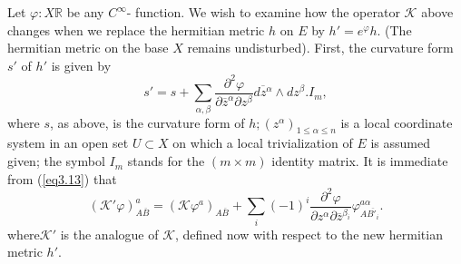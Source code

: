   Let $\varphi : X \mathbb{R}$ be any $C^{\infty}$- function. We
  wish to examine how the operator $\mathcal{K}$ above changes when we
  replace the hermitian metric $h$ on $E$ by $h'=e^\varphi h$. (The
  hermitian metric on the base $X$ remains undisturbed). First, the
  curvature form $s'$ of $h'$ is given by  
  $$
  s' = s + \sum\limits_{\alpha,\beta}\frac{\partial^2
    \varphi}{\partial \overline{z}^\alpha \partial
    z^\beta}\overline{dz^\alpha}\wedge dz^\beta. I_m , 
  $$
  where $s$, as above, is the curvature form of $h; (z^\alpha)_{1\leq
    \alpha \leq n}$ is a local coordinate system in an open set 
  $U\subset X$ on which a local trivialization of $E$ is assumed given;
  the symbol $I_m$ stands for the $(m \times m)$ identity matrix. It is
  immediate from (\ref{eq3.13}) that  
  $$
  (\mathcal{K}'\varphi)^a_{A\overline{B}}=( \mathcal{K}\varphi^a)_{A\overline{B}}+ 
  \displaystyle\sum_i(-1)^i \frac{\partial^2 \varphi}{\partial z^\alpha
    \partial \overline{z}^{\beta_i}}  \varphi^{a\alpha}_{A\overline{B'_i}}.
  $$
  where\pageoriginale $\mathcal{K}'$ is the analogue of $\mathcal{K}$,
  defined now with respect to the new hermitian metric $h'$.  
